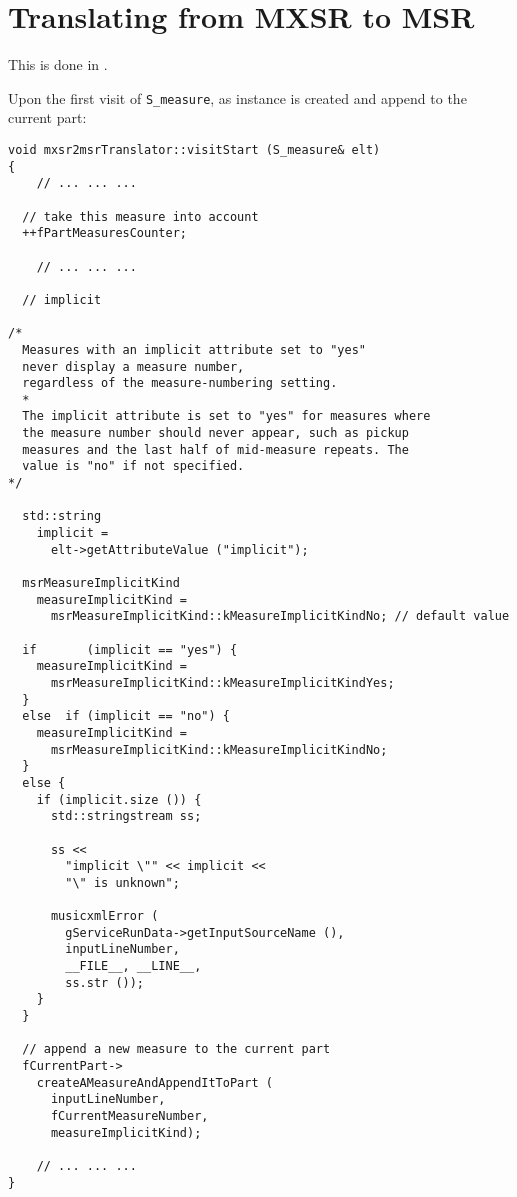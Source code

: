 \section{Translating from MXSR to MSR}

This is done in \mxsrToMsr{}.

Upon the first visit of {\tt S_measure}, as  instance is created and append to the current part:
\begin{lstlisting}[language=CPlusPlus]
void mxsr2msrTranslator::visitStart (S_measure& elt)
{
	// ... ... ...

  // take this measure into account
  ++fPartMeasuresCounter;

	// ... ... ...

  // implicit

/*
  Measures with an implicit attribute set to "yes"
  never display a measure number,
  regardless of the measure-numbering setting.
  *
  The implicit attribute is set to "yes" for measures where
  the measure number should never appear, such as pickup
  measures and the last half of mid-measure repeats. The
  value is "no" if not specified.
*/

  std::string
    implicit =
      elt->getAttributeValue ("implicit");

  msrMeasureImplicitKind
    measureImplicitKind =
      msrMeasureImplicitKind::kMeasureImplicitKindNo; // default value

  if       (implicit == "yes") {
    measureImplicitKind =
      msrMeasureImplicitKind::kMeasureImplicitKindYes;
  }
  else  if (implicit == "no") {
    measureImplicitKind =
      msrMeasureImplicitKind::kMeasureImplicitKindNo;
  }
  else {
    if (implicit.size ()) {
      std::stringstream ss;

      ss <<
        "implicit \"" << implicit <<
        "\" is unknown";

      musicxmlError (
        gServiceRunData->getInputSourceName (),
        inputLineNumber,
        __FILE__, __LINE__,
        ss.str ());
    }
  }

  // append a new measure to the current part
  fCurrentPart->
    createAMeasureAndAppendItToPart (
      inputLineNumber,
      fCurrentMeasureNumber,
      measureImplicitKind);

	// ... ... ...
}
\end{lstlisting}


